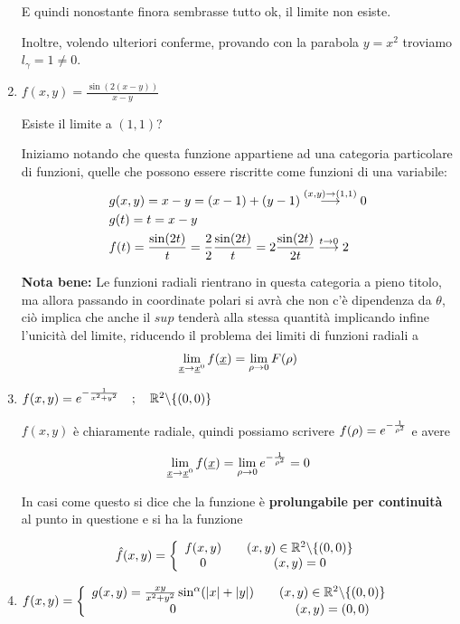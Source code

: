 \begin{enumerate}
	E quindi nonostante finora sembrasse tutto ok, il limite non esiste. 
	
	Inoltre, volendo ulteriori conferme, provando con la parabola $y=x^2$ troviamo $l_\gamma=1\neq 0$.
	
	\item $f(x,y)=\frac{\sin(2(x-y))}{x-y}$

	Esiste il limite a $(1,1)$?
	
	Iniziamo notando che questa funzione appartiene ad una categoria particolare di funzioni, quelle che possono essere riscritte come funzioni di una variabile:
	\begin{align}
	{}&g(x,y)=x-y = (x-1) + (y-1) \overset{(x,y) \rightarrow (1,1)}{\longrightarrow} 0\\
	&g(t)=t=x-y\\
	&f(t)=\frac{\sin(2t)}{t}=\frac{2}{2}\frac{\sin(2t)}{t}=2\frac{\sin(2t)}{2t} \overset{t \rightarrow 0}{\longrightarrow} 2 	
	\end{align}

	\textbf{Nota bene:} Le funzioni radiali rientrano in questa categoria a pieno titolo, ma allora passando in coordinate polari si avrà che non c'è dipendenza da $\theta$, ciò implica che anche il $sup$ tenderà alla stessa quantità implicando infine l'unicità del limite, riducendo il problema dei limiti di funzioni radiali a 
	\begin{align}
	\underset{\underline{x} \rightarrow \underline{x}^0}{\lim} \,f(\underline{x})=\underset{\rho \rightarrow 0}{\lim} \,F(\rho) 
	\end{align}
	
	\item $f(x,y)=e^{-\frac{1}{x^2 + y^2}} \quad ; \quad \mathbb{R}^2\backslash \{ (0,0) \}$
	
	$f(x,y)$ è chiaramente radiale, quindi possiamo scrivere $f(\rho)=e^{-\frac{1}{\rho^2}}$ e avere
	
	\begin{align}
	\underset{\underline{x} \rightarrow \underline{x}^0}{\lim} \,f(\underline{x})=\underset{\rho \rightarrow 0}{\lim} \,e^{-\frac{1}{\rho^2}}=0
	\end{align}
	
	In casi come questo si dice che la funzione è \textbf{prolungabile per continuità} al punto in questione e si ha la funzione
	
	\begin{align}
	\hat{f}(x,y)= \left\{\begin{array}{cc} f(x,y) \quad {}&(x,y)\in\mathbb{R}^2 \backslash \{(0,0)\} \\ 0 \quad &(x,y)=0 \end{array}\right.
	\end{align}
	
	\item $f(x,y)= \left\{\begin{array}{cc} g(x,y)=\frac{xy}{x^2 + y^2}\sin^\alpha(|x| + |y|) \quad {}& (x,y)\in \mathbb{R}^2\backslash \{ (0,0) \} \\ 0 \quad &(x,y)=(0,0) \end{array}\right.$
	

\end{enumerate}
